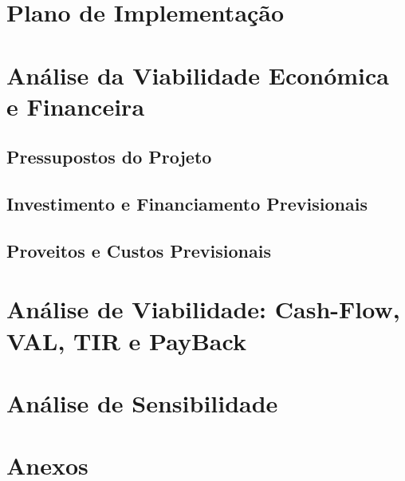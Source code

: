 \documentclass[11pt]{article}
\begin{document}
	\normalsize
	
	\pagebreak
	
	\large
	\section{Plano de Implementação}
	
	\normalsize
	
	\pagebreak
	
	\large
	\section{Análise da Viabilidade Económica e Financeira}
	
	\normalsize
	
	\large
	\subsection{Pressupostos do Projeto}
	
	\normalsize
	
	
	\large
	\subsection{Investimento e Financiamento Previsionais}
	
	\normalsize
	
	
	\large
	\subsection{Proveitos e Custos Previsionais}
	
	\normalsize
	
	\pagebreak
	
	\large
	\section{Análise de Viabilidade: Cash-Flow, VAL, TIR e PayBack}
	
	\normalsize
	
	\pagebreak
	
	\large
	\section{Análise de Sensibilidade}
	
	\normalsize
	
	
	\pagebreak
	
	\large
	\section{Anexos}
	
\end{document}
